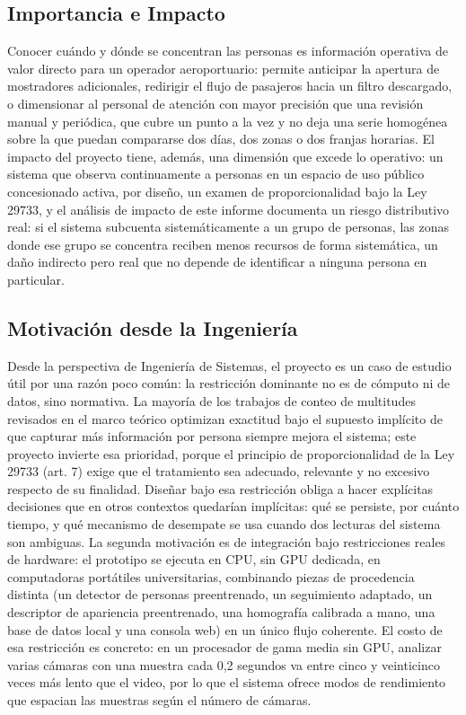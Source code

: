 \subsection{Importancia e Impacto}
\label{subsec:importancia-impacto}

Conocer cuándo y dónde se concentran las personas es información operativa de valor
directo para un operador aeroportuario: permite anticipar la apertura de mostradores
adicionales, redirigir el flujo de pasajeros hacia un filtro descargado, o dimensionar al personal
de atención con mayor precisión que una revisión manual y periódica, que cubre un punto a la
vez y no deja una serie homogénea sobre la que puedan compararse dos días, dos zonas o dos
franjas horarias. El impacto del proyecto tiene, además, una dimensión que excede lo
operativo: un sistema que observa continuamente a personas en un espacio de uso público
concesionado activa, por diseño, un examen de proporcionalidad bajo la Ley 29733, y el
análisis de impacto de este informe documenta un riesgo distributivo real: si el sistema
subcuenta sistemáticamente a un grupo de personas, las zonas donde ese grupo se concentra
reciben menos recursos de forma sistemática, un daño indirecto pero real que no depende de
identificar a ninguna persona en particular.

\subsection{Motivación desde la Ingeniería}
\label{subsec:motivacion-ingenieria}

Desde la perspectiva de Ingeniería de Sistemas, el proyecto es un caso de estudio útil por
una razón poco común: la restricción dominante no es de cómputo ni de datos, sino normativa.
La mayoría de los trabajos de conteo de multitudes revisados en el marco teórico optimizan
exactitud bajo el supuesto implícito de que capturar más información por persona siempre
mejora el sistema; este proyecto invierte esa prioridad, porque el principio de proporcionalidad
de la Ley 29733 (art. 7) exige que el tratamiento sea adecuado, relevante y no excesivo respecto
de su finalidad. Diseñar bajo esa restricción obliga a hacer explícitas decisiones que en otros
contextos quedarían implícitas: qué se persiste, por cuánto tiempo, y qué mecanismo de
desempate se usa cuando dos lecturas del sistema son ambiguas. La segunda motivación es de
integración bajo restricciones reales de hardware: el prototipo se ejecuta en CPU, sin GPU
dedicada, en computadoras portátiles universitarias, combinando piezas de procedencia distinta
(un detector de personas preentrenado, un seguimiento adaptado, un descriptor de apariencia
preentrenado, una homografía calibrada a mano, una base de datos local y una consola web) en
un único flujo coherente. El costo de esa restricción es concreto: en un procesador de gama
media sin GPU, analizar varias cámaras con una muestra cada 0,2 segundos va entre cinco y
veinticinco veces más lento que el video, por lo que el sistema ofrece modos de rendimiento que
espacian las muestras según el número de cámaras.

